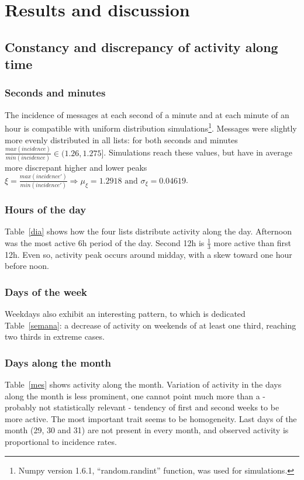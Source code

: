 \documentclass[%
 aip,
 jmp,%
 amsmath,amssymb,
 reprint,%
]{revtex4-1}
\begin{document}
\section{Results and discussion}
    \subsection{Constancy and discrepancy of activity along time}\label{constDisc}
        \subsubsection{Seconds and minutes}
The incidence of messages at each second of a minute and at each minute of an hour is compatible with uniform distribution simulations\footnote{Numpy version 1.6.1, ``random.randint'' function, was used for simulations.}. Messages were slightly more evenly distributed in all lists: for both seconds and minutes  $\frac{max(incidence)}{min(incidence)} \in (1.26,1.275]$. Simulations reach these values, but have in average more discrepant higher and lower peaks $\xi=\frac{max(incidence')}{min(incidence')} \Rightarrow \mu_\xi=1.2918 \text{ and } \sigma_\xi=0.04619$.

        \subsubsection{Hours of the day}
Table~\ref{dia} shows how the four lists distribute activity along the day.
Afternoon was the most active 6h period of the day. Second 12h is $\frac{1}{3}$ more active than first 12h. Even so, activity peak occurs around midday, with a skew toward one hour before noon.

        \subsubsection{Days of the week}
 Weekdays also exhibit an interesting pattern, to which is dedicated Table~\ref{semana}: a decrease of activity on weekends of at least one third, reaching two thirds in extreme cases.

        \subsubsection{Days along the month}
 Table~\ref{mes} shows activity along the month. Variation of activity in the days along the month is less prominent, one cannot point much more than a - probably not statistically relevant - tendency of first and second weeks to be more active. The most important trait seems to be homogeneity. Last days of the month (29, 30 and 31) are not present in every month, and observed activity is proportional to incidence rates.
\end{document}
